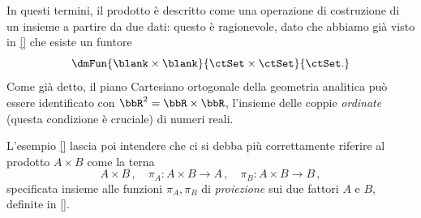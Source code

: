 In questi termini, il prodotto è descritto come una operazione di costruzione di un insieme a partire da due dati: questo è ragionevole, dato che abbiamo già visto in \ref{} che esiste un funtore
\[\dmFun{\blank\times\blank}{\ctSet\times\ctSet}{\ctSet.}\]
Come già detto, il piano Cartesiano ortogonale della geometria analitica può essere identificato con \(\bbR^2=\bbR\times\bbR\), l'insieme delle coppie \emph{ordinate} (questa condizione è cruciale) di numeri reali.

L'esempio \ref{} lascia poi intendere che ci si debba più correttamente riferire al prodotto \(A\times B\) come la terna
\[
	A\times B\,,\quad \pi_A\colon A\times B\to A\,,\quad \pi_B\colon A\times B\to B\,,
\]
specificata insieme alle funzioni \(\pi_A,\pi_B\) di \emph{proiezione} sui due fattori \(A\) e \(B\), definite in \ref{}.

